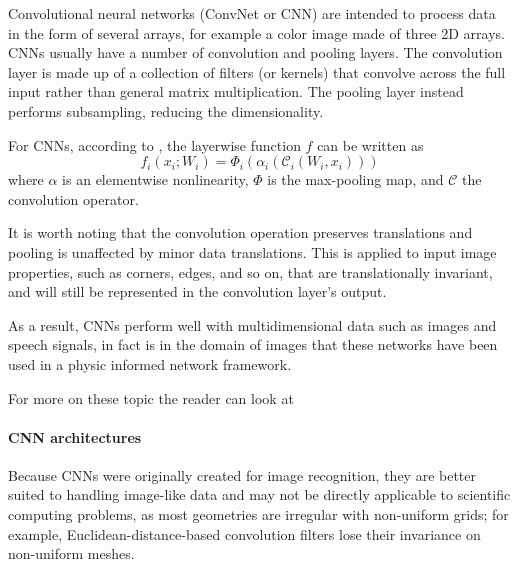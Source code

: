 \documentclass[pdflatex,sn-basic]{sn-jnl}%
\theoremstyle{thmstyleone}%
\theoremstyle{thmstyletwo}%
\theoremstyle{thmstylethree}%
\begin{document}
Convolutional neural networks (ConvNet or CNN) are intended to process data in the form of several arrays, for example a color image made of three 2D arrays. %
CNNs usually have a number of convolution and pooling layers. %
The convolution layer is made up of a collection of filters (or kernels) that convolve across the full input  rather than general matrix multiplication. %
The pooling layer instead performs subsampling, reducing the dimensionality. %

For CNNs, according to \cite{Cat2018_SpecificNetworkDescriptions_ChaCC}, the layerwise function $f$ can be written as
$$
f_i (x_i; W_i) = \Phi_i (\alpha_i(\mathcal{C}_i(W_i,x_i)))
$$
where $\alpha$ is an elementwise nonlinearity,  $\Phi$ is the max-pooling map, and $\mathcal{C}$  the convolution operator.

It is worth noting that the convolution operation preserves translations 
and pooling is unaffected by minor data translations. 
This is applied to input image properties, such as corners, edges, and so on, that are translationally invariant, and will still be represented in the convolution layer's output.

As a result, CNNs perform well with multidimensional data such as images and speech signals, in fact is in the domain of images
that these networks have been used in a physic informed network framework. 

For more on these topic the reader can look at 
\cite{LeC2015_DeepLearning_BenLBH, Che2018_RiseDeepLearning_EngCEW, Muh2021_DeepLearningApplication_AseMAC, Ald2020_DeepLearningApproaches_DerADE, Ber2019_SurveyDeepLearning_BucBBCC, Cal2020_ConvolutionalNetworks_Cal}




\paragraph{CNN architectures}  %

Because CNNs were originally created for image recognition, they are better suited to handling image-like data and may not be directly applicable to scientific computing problems, as most geometries are irregular with non-uniform grids; for example, Euclidean-distance-based convolution filters lose their invariance on non-uniform meshes.
\end{document}
